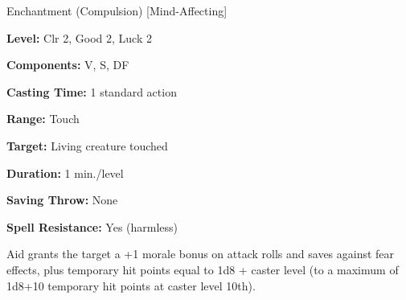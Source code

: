 
Enchantment (Compulsion) [Mind-Affecting]

\textbf{Level:} Clr 2, Good 2, Luck 2

\textbf{Components:} V, S, DF

\textbf{Casting Time:} 1 standard action

\textbf{Range:} Touch

\textbf{Target:} Living creature touched

\textbf{Duration:} 1 min./level

\textbf{Saving Throw:} None

\textbf{Spell Resistance:} Yes (harmless)

Aid grants the target a +1 morale bonus on attack rolls and saves against 
fear effects, plus temporary hit points equal to 1d8 + caster level (to a maximum 
of 1d8+10 temporary hit points at caster level 10th).

